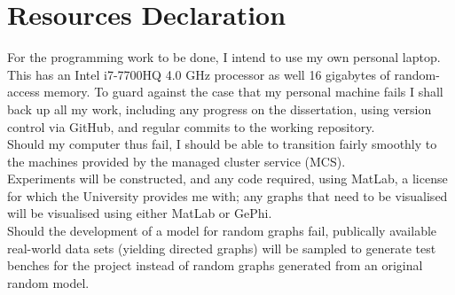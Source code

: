 \documentclass[a4paper,12pt]{article}
\begin{document}
\section*{Resources Declaration}
	For the programming work to be done, I intend to use my own personal laptop. This has an
	Intel i7-7700HQ 4.0 GHz processor as well 16 gigabytes of random-access memory. To guard 
	against the case that my personal machine fails I shall back up all my work, including any 
	progress on the dissertation, using version control via GitHub, and regular commits to the 
	working repository. \\
	Should my computer thus fail, I should be able to transition fairly smoothly to the 
	machines provided by the managed cluster service (MCS). \\
	Experiments will be constructed, and any code required, using MatLab, a license for which
	the University provides me with; any graphs that need to be visualised will be visualised 
	using either MatLab or GePhi. \\
	Should the development of a model for random graphs fail, publically available real-world 
	data sets (yielding directed graphs) will be sampled to generate test benches for the 
	project instead of random graphs generated from an original random model.
\printbibliography
\end{document}
